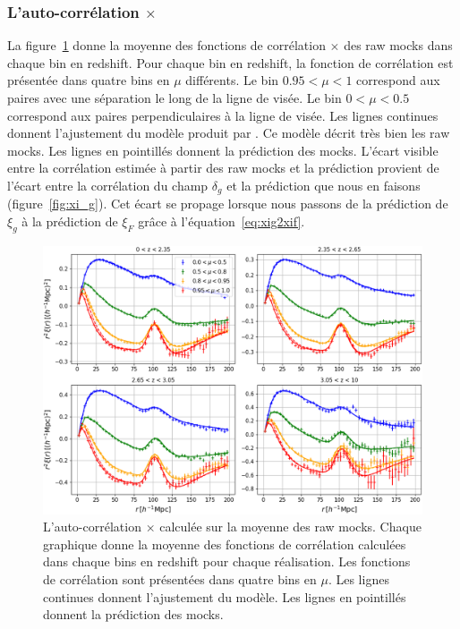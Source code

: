 \subsubsection{L'auto-corrélation \lya{}$\times$\lya{}}
La figure~\ref{fig:cf_ebossraw_4bins} donne la moyenne des \Nmocks{} fonctions de corrélation \lya{}$\times$\lya{} des raw mocks dans chaque bin en redshift.
Pour chaque bin en redshift, la fonction de corrélation est présentée dans quatre bins en $\mu$ différents. Le bin $\num{0.95} < \mu < 1$ correspond aux paires avec une séparation le long de la ligne de visée. Le bin $\num{0} < \mu < \num{0.5}$ correspond aux paires perpendiculaires à la ligne de visée.
Les lignes continues donnent l'ajustement du modèle produit par \picca{}.
Ce modèle décrit très bien les raw mocks.
Les lignes en pointillés donnent la prédiction des mocks. L'écart visible entre la corrélation estimée à partir des raw mocks et la prédiction provient de l'écart entre la corrélation du champ $\delta_g$ et la prédiction que nous en faisons (figure~\ref{fig:xi_g}). Cet écart se propage lorsque nous passons de la prédiction de $\xi_g$ à la prédiction de $\xi_F$ grâce à l'équation~\ref{eq:xig2xif}.
\begin{figure}
  \centering
  \includegraphics[scale=0.4]{cf_ebossraw_4bins_pred}
  \caption{L'auto-corrélation \lya{}$\times$\lya{} calculée sur la moyenne des \Nmocks{} raw mocks. Chaque graphique donne la moyenne des fonctions de corrélation calculées dans chaque bins en redshift pour chaque réalisation. Les fonctions de corrélation sont présentées dans quatre bins en $\mu$. Les lignes continues donnent l'ajustement du modèle. Les lignes en pointillés donnent la prédiction des mocks.}
  \label{fig:cf_ebossraw_4bins}
\end{figure}

